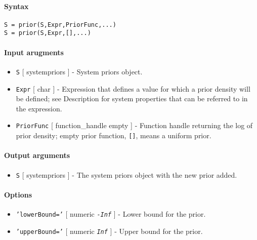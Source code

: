 


	\paragraph{Syntax}\label{syntax}

\begin{verbatim}
S = prior(S,Expr,PriorFunc,...)
S = prior(S,Expr,[],...)
\end{verbatim}

\paragraph{Input arugments}\label{input-arugments}

\begin{itemize}
\item
  \texttt{S} {[} systempriors {]} - System priors object.
\item
  \texttt{Expr} {[} char {]} - Expression that defines a value for which
  a prior density will be defined; see Description for system properties
  that can be referred to in the expression.
\item
  \texttt{PriorFunc} {[} function\_handle \textbar{} empty {]} -
  Function handle returning the log of prior density; empty prior
  function, \texttt{{[}{]}}, means a uniform prior.
\end{itemize}

\paragraph{Output arguments}\label{output-arguments}

\begin{itemize}
\itemsep1pt\parskip0pt
\item
  \texttt{S} {[} systempriors {]} - The system priors object with the
  new prior added.
\end{itemize}

\paragraph{Options}\label{options}

\begin{itemize}
\item
  \texttt{'lowerBound='} {[} numeric \textbar{} \emph{\texttt{-Inf}} {]}
  - Lower bound for the prior.
\item
  \texttt{'upperBound='} {[} numeric \textbar{} \emph{\texttt{Inf}} {]}
  - Upper bound for the prior.
\end{itemize}

